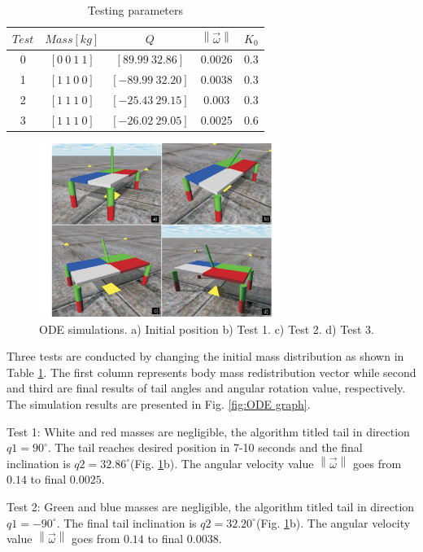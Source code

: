 \begin{table}
	\centering
\begin{tabular}{|c|c|c|c|c|}
	\hline
$Test$ &  $Mass[kg]$ & $Q$  & $\left \| \vec{\omega} \right \|$ & $K_0$\\
	\hline
0   & $[0\: 0\: 1\: 1]$ & $[89.99\: 32.86]$ & 0.0026 & 0.3\\
1   & $[1\: 1\: 0\: 0]$ & $[-89.99\: 32.20]$ & 0.0038 & 0.3\\
2   & $[1\: 1\: 1\: 0]$ & $[-25.43\: 29.15]$ &  0.003 & 0.3\\
3   & $[1\: 1\: 1\: 0]$ & $[-26.02\: 29.05]$ &  0.0025 & 0.6\\
\hline
\end{tabular}
\caption{Testing parameters}\label{tab:Simulations}
\end{table}



\begin{figure}
	\centering
	\includegraphics[width=80mm]{./pictures/ODE_simulations.pdf}
	\caption{ODE simulations. a) Initial position b) Test 1. c) Test 2. d) Test 3.}
	\label{fig:ODESimulations}
\end{figure}

Three tests are conducted by changing the initial mass distribution as shown in Table \ref{tab:Simulations}. The first column represents body mass redistribution vector while second and third are final results of tail angles and angular rotation value, respectively. The simulation results are presented in Fig. \ref{fig:ODE graph}. 

Test 1: White and red masses are negligible, the algorithm titled tail in direction $q1=90^{\circ}$. The tail reaches desired position in 7-10 seconds and the final inclination is $q2=32.86^{\circ}$(Fig. \ref{fig:ODESimulations}b). The angular velocity value $\left \| \vec{\omega} \right \|$ goes from $0.14$ to final $0.0025$.

Test 2: Green and blue masses are negligible, the algorithm titled tail in direction $q1=-90^{\circ}$. The final tail inclination is $q2=32.20^{\circ}$(Fig. \ref{fig:ODESimulations}b). The angular velocity value $\left \| \vec{\omega} \right \|$ goes from $0.14$ to final $0.0038$. 

